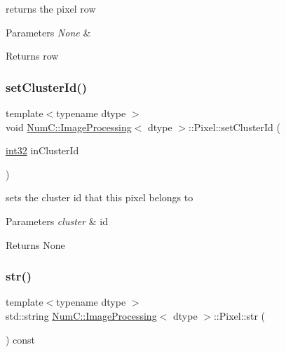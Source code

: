 returns the pixel row


\begin{DoxyParams}{Parameters}
{\em None} & \\
\hline
\end{DoxyParams}
\begin{DoxyReturn}{Returns}
row 
\end{DoxyReturn}
\mbox{\label{class_num_c_1_1_image_processing_1_1_pixel_a87855b80b4b6daa9ee191b3b36d3070f}} 
\subsubsection{\texorpdfstring{set\+Cluster\+Id()}{setClusterId()}}
{\footnotesize\ttfamily template$<$typename dtype $>$ \\
void \mbox{\hyperlink{class_num_c_1_1_image_processing}{Num\+C\+::\+Image\+Processing}}$<$ dtype $>$\+::Pixel\+::set\+Cluster\+Id (\begin{DoxyParamCaption}\item[{\mbox{\hyperlink{namespace_num_c_aa5a7e69266097d55816d4cdb19542b53}{int32}}}]{in\+Cluster\+Id }\end{DoxyParamCaption})\hspace{0.3cm}{\ttfamily [inline]}}

sets the cluster id that this pixel belongs to


\begin{DoxyParams}{Parameters}
{\em cluster} & id\\
\hline
\end{DoxyParams}
\begin{DoxyReturn}{Returns}
None 
\end{DoxyReturn}
\mbox{\label{class_num_c_1_1_image_processing_1_1_pixel_afbed86453c85c54a480240b0755e51be}} 
\subsubsection{\texorpdfstring{str()}{str()}}
{\footnotesize\ttfamily template$<$typename dtype $>$ \\
std\+::string \mbox{\hyperlink{class_num_c_1_1_image_processing}{Num\+C\+::\+Image\+Processing}}$<$ dtype $>$\+::Pixel\+::str (\begin{DoxyParamCaption}{ }\end{DoxyParamCaption}) const\hspace{0.3cm}{\ttfamily [inline]}}

